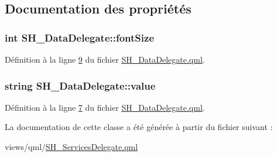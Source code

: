 \subsection{Documentation des propriétés}
\hypertarget{classSH__DataDelegate_afbb41ad9b513c7f27e7b5ad90d82e95b}{
\subsubsection[{font\-Size}]{\setlength{\rightskip}{0pt plus 5cm}int S\-H\-\_\-\-Data\-Delegate\-::font\-Size\hspace{0.3cm}{\ttfamily [inherited]}}}\label{classSH__DataDelegate_afbb41ad9b513c7f27e7b5ad90d82e95b}


Définition à la ligne \hyperlink{SH__DataDelegate_8qml_source_l00009}{9} du fichier \hyperlink{SH__DataDelegate_8qml_source}{S\-H\-\_\-\-Data\-Delegate.\-qml}.

\hypertarget{classSH__DataDelegate_acb9da3c73493c88865e08d9575f26482}{
\subsubsection[{value}]{\setlength{\rightskip}{0pt plus 5cm}string S\-H\-\_\-\-Data\-Delegate\-::value\hspace{0.3cm}{\ttfamily [inherited]}}}\label{classSH__DataDelegate_acb9da3c73493c88865e08d9575f26482}


Définition à la ligne \hyperlink{SH__DataDelegate_8qml_source_l00007}{7} du fichier \hyperlink{SH__DataDelegate_8qml_source}{S\-H\-\_\-\-Data\-Delegate.\-qml}.



La documentation de cette classe a été générée à partir du fichier suivant \-:\begin{DoxyCompactItemize}
\item 
views/qml/\hyperlink{SH__ServicesDelegate_8qml}{S\-H\-\_\-\-Services\-Delegate.\-qml}\end{DoxyCompactItemize}
